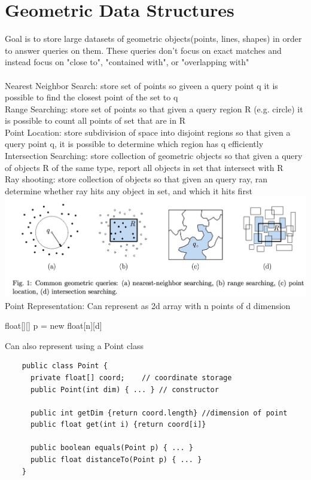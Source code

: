\documentclass{article}
\begin{document}
  \section{Geometric Data Structures}
  Goal is to store large datasets of geometric objects(points, lines, shapes) in order to answer queries on them. These queries don't focus on exact matches and instead focus on "close to", "contained with", or "overlapping with"\\ \\
  Nearest Neighbor Search: store set of points so giveen a query point q it is possible to find the closest point of the set to q\\
  Range Searching: store set of points so that given a query region R (e.g. circle) it is possible to count all points of set that are in R\\
  Point Location: store subdivision of space into disjoint regions so that given a query point q, it is possible to determine which region has q efficiently\\
  Intersection Searching: store collection of geometric objects so that given a query of objects R of the same type, report all objects in set that intersect with R\\
  Ray shooting: store collection of objects so that given an query ray, ran determine whether ray hits any object in set, and which it hits first\\
  \includegraphics[width=\textwidth]{GeometricQueries}
  Point Representation: Can represent as 2d array with n points of d dimension
  \begin{center}
    float[][] p = new float[n][d]
  \end{center}
  Can also represent using a Point class
  \begin{lstlisting}
    public class Point {
      private float[] coord;    // coordinate storage
      public Point(int dim) { ... } // constructor

      public int getDim {return coord.length} //dimension of point
      public float get(int i) {return coord[i]}

      public boolean equals(Point p) { ... }
      public float distanceTo(Point p) { ... }
    }
  \end{lstlisting}
\end{document}
